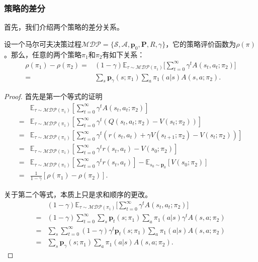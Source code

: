 \subsubsection{策略的差分}
首先，我们介绍两个策略的差分关系。
\begin{lemma}
    设一个马尔可夫决策过程$\mathcal{MDP} = \{\mathcal{S}, \mathcal{A}, \mathbf{p}_0, \mathbf{P}, R, \gamma\}$，它的策略评价函数为$\rho(\pi)$。那么，任意的两个策略$\pi_1$和$\pi_2$有如下关系：
    \begin{equation}
        \begin{aligned}
            \rho(\pi_1) - \rho(\pi_2) =& (1 - \gamma)\mathbb{E}_{\tau \sim \mathcal{MDP}(\pi_1)} \bigg[\sum^{\infty}_{t=0} \gamma^t A(s_t, a_t; \pi_2)\bigg]\\
            =& \sum_s \mathbf{p}_\gamma(s; \pi_1) \sum_a \pi_1(a \vert s) A(s, a; \pi_2).
        \end{aligned}
    \end{equation}
\end{lemma}
\begin{proof}
    首先是第一个等式的证明
    \begin{align*}
    & \mathbb{E}_{\tau\sim\mathcal{MDP}(\pi_1)}\left[\sum^{\infty}_{t=0} \gamma^t A(s_t, a_t; \pi_2)\right]\\
    =& \mathbb{E}_{\tau\sim\mathcal{MDP}(\pi_1)}\left[\sum^{\infty}_{t=0} \gamma^t (Q(s_t, a_t; \pi_2) - V(s_t; \pi_2))\right]\\
    =& \mathbb{E}_{\tau\sim\mathcal{MDP}(\pi_1)}\left[\sum^{\infty}_{t=0} \gamma^t (r(s_t, a_t)+\gamma V(s_{t+1}; \pi_2) - V(s_t; \pi_2))\right]\\
    =& \mathbb{E}_{\tau\sim\mathcal{MDP}(\pi_1)}\left[\sum^{\infty}_{t=0} \gamma^t r(s_t, a_t) - V(s_0; \pi_2)\right]\\
    =& \mathbb{E}_{\tau\sim\mathcal{MDP}(\pi_1)}\left[\sum^{\infty}_{t=0} \gamma^t r(s_t, a_t)\right] - \mathbb{E}_{s_0 \sim \mathbf{p}_0}\left[V(s_0; \pi_2)\right]\\
    =& \frac{1}{1 - \gamma}[\rho(\pi_1) - \rho(\pi_2)].
    \end{align*}

    关于第二个等式，本质上只是求和顺序的更改。
    \begin{align*}
        &(1 - \gamma)\mathbb{E}_{\tau \sim \mathcal{MDP}(\pi_1)} \bigg[\sum^{\infty}_{t=0} \gamma^t A(s_t, a_t; \pi_2)\bigg]\\
        =& (1 - \gamma) \sum^{\infty}_{t=0} \sum_s \mathbf{p}_t(s; \pi_1) \sum_{a} \pi_1(a \vert s) \gamma^t A(s, a; \pi_2) \\
        =& \sum_s \sum^{\infty}_{t=0} (1 - \gamma) \gamma^t \mathbf{p}_t(s; \pi_1) \sum_{a} \pi_1(a \vert s) A(s, a; \pi_2) \\
        =& \sum_s \mathbf{p}_\gamma(s; \pi_1) \sum_{a} \pi_1(a \vert s) A(s, a; \pi_2).
    \end{align*}
\end{proof}

